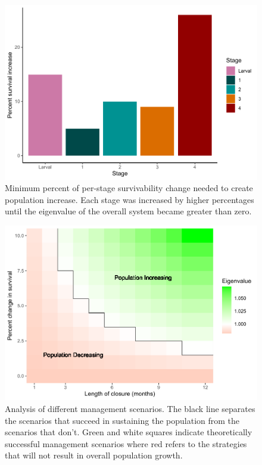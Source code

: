 \documentclass[
]{article}
\begin{document}
\begin{figure}
\centering
\includegraphics{Wulfing_CH1_Preprint_files/figure-latex/stages-1.pdf}
\caption{\label{fig:stages}Minimum percent of per-stage survivability change needed to create population increase. Each stage was increased by higher percentages until the eigenvalue of the overall system became greater than zero. \label{stages}}
\end{figure}



\begin{figure}
\centering
\includegraphics{Wulfing_CH1_Preprint_files/figure-latex/closures-1.pdf}
\caption{\label{fig:closures}Analysis of different management scenarios. The black line separates the scenarios that succeed in sustaining the population from the scenarios that don't. Green and white squares indicate theoretically successful management scenarios where red refers to the strategies that will not result in overall population growth. \label{closures}}
\end{figure}
\end{document}
